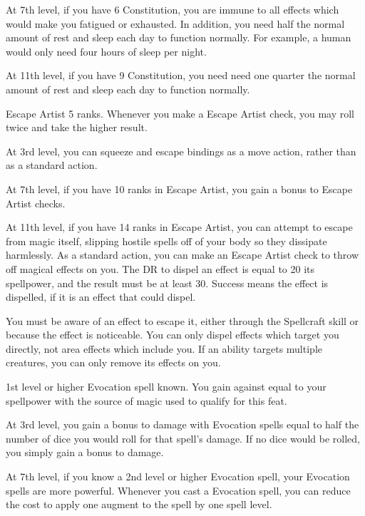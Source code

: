    At 7th level, if you have 6 Constitution, you are immune to all effects which would make you fatigued or exhausted.
    In addition, you need half the normal amount of rest and sleep each day to function normally.
    For example, a human would only need four hours of sleep per night.

    At 11th level, if you have 9 Constitution, you need need one quarter the normal amount of rest and sleep each day to function normally.

    \featpre Escape Artist 5 ranks.
    \featben Whenever you make a Escape Artist check, you may roll twice and take the higher result.

    At 3rd level, you can squeeze and escape bindings as a move action, rather than as a standard action.

    At 7th level, if you have 10 ranks in Escape Artist, you gain a  bonus to Escape Artist checks.

    At 11th level, if you have 14 ranks in Escape Artist, you can attempt to escape from magic itself, slipping hostile spells off of your body so they dissipate harmlessly.
    As a standard action, you can make an Escape Artist check to throw off magical effects on you.
    The DR to dispel an effect is equal to 20 \add its spellpower, and the result must be at least 30.
    Success means the effect is dispelled, if it is an effect that  could dispel.

    You must be aware of an effect to escape it, either through the Spellcraft skill or because the effect is noticeable.
    You can only dispel effects which target you directly, not area effects which include you.
    If an ability targets multiple creatures, you can only remove its effects on you.

    \featpre 1st level or higher Evocation spell known.
    \featben You gain  against  equal to your spellpower with the source of magic used to qualify for this feat.

    At 3rd level, you gain a bonus to damage with Evocation spells equal to half the number of dice you would roll for that spell's damage.
    If no dice would be rolled, you simply gain a  bonus to damage.

    At 7th level, if you know a 2nd level or higher Evocation spell, your Evocation spells are more powerful.
    Whenever you cast a Evocation spell, you can reduce the cost to apply one augment to the spell by one spell level.

